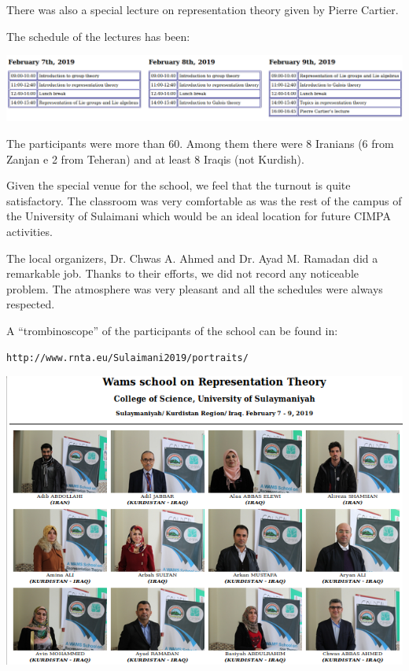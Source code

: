 \documentclass[12pt,a4paper]{scrartcl}
\begin{document}
There was also a special lecture on representation theory given by Pierre Cartier.


The schedule of the lectures has been:

\centerline{\includegraphics[width=18cm]{schedule.png}}

The participants were more than 60. Among them there were 8 Iranians (6 from Zanjan e 2 from Teheran) and at least 8 Iraqis (not Kurdish). 

Given the special venue for the school, we feel that the turnout is quite satisfactory.
The classroom was very comfortable as was the rest of the campus of the University of Sulaimani which would be an ideal location for future CIMPA activities.

The local organizers, Dr. Chwas A. Ahmed and Dr. Ayad M. Ramadan did a remarkable job. 
Thanks to their efforts, we did not record any noticeable problem. The atmosphere was very pleasant
and all the schedules were always respected.


A ``trombinoscope'' of the participants of the school can be found in:

\centerline{\texttt{http://www.rnta.eu/Sulaimani2019/portraits/}}

\bigskip

\centerline{\includegraphics[width=18cm]{trombino1.png}}
\end{document}
